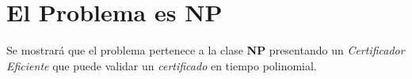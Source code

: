 \section{El Problema es NP}
Se mostrará que el problema pertenece a la clase \textbf{NP} presentando
un \textit{Certificador Eficiente} que puede validar un \textit{certificado} en
tiempo polinomial.